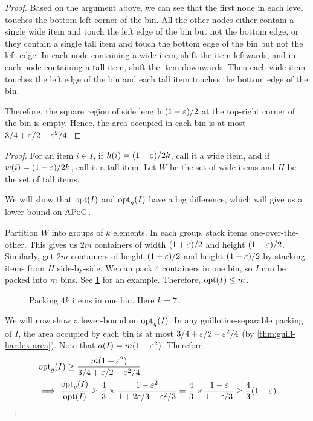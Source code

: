 \begin{proof}
Based on the argument above, we can see that the first node in each level
touches the bottom-left corner of the bin. All the other nodes either
contain a single wide item and touch the left edge of the bin but not the bottom edge,
or they contain a single tall item and touch the bottom edge of the bin but not the left edge.
In each node containing a wide item, shift the item leftwards,
and in each node containing a tall item, shift the item downwards.
Then each wide item touches the left edge of the bin
and each tall item touches the bottom edge of the bin.

Therefore, the square region of side length $(1-\varepsilon)/2$
at the top-right corner of the bin is empty.
Hence, the area occupied in each bin is at most $3/4 + \varepsilon/2 - \varepsilon^2/4$.
\end{proof}

\rdefHardItems*

\rthmAPoGLB*
\begin{proof}
For an item $i \in I$, if $h(i) = (1-\varepsilon)/2k$, call it a wide item,
and if $w(i) = (1-\varepsilon)/2k$, call it a tall item.
Let $W$ be the set of wide items and $H$ be the set of tall items.

We will show that $\operatorname{opt}(I)$ and $\operatorname{opt}_g(I)$ have a big difference,
which will give us a lower-bound on $\mathrm{APoG}$.

Partition $W$ into groups of $k$ elements.
In each group, stack items one-over-the-other.
This gives us $2m$ containers of width $(1+\varepsilon)/2$ and height $(1-\varepsilon)/2$.
Similarly, get $2m$ containers of height $(1+\varepsilon)/2$ and height $(1-\varepsilon)/2$
by stacking items from $H$ side-by-side.
We can pack 4 containers in one bin, so $I$ can be packed into $m$ bins.
See \cref{fig:thin-gadget} for an example.
Therefore, $\operatorname{opt}(I) \le m$.

\begin{figure}[htb]
\centering

\caption{Packing $4k$ items in one bin. Here $k = 7$.}
\label{fig:thin-gadget}
\end{figure}

We will now show a lower-bound on $\operatorname{opt}_g(I)$.
In any guillotine-separable packing of $I$,
the area occupied by each bin is at most $3/4 + \varepsilon/2 - \varepsilon^2/4$
(by \cref{thm:guill-hardex-area}).
Note that $a(I) = m(1 - \varepsilon^2)$. Therefore,
\begin{align*}
& \operatorname{opt}_g(I) \ge \frac{m(1-\varepsilon^2)}{3/4 + \varepsilon/2 - \varepsilon^2/4}
\\ &\implies \frac{\operatorname{opt}_g(I)}{\operatorname{opt}(I)}
    \ge \frac{4}{3} \times \frac{1-\varepsilon^2}{1 + 2\varepsilon/3 - \varepsilon^2/3}
    = \frac{4}{3} \times \frac{1-\varepsilon}{1 - \varepsilon/3}
    \ge \frac{4}{3}(1-\varepsilon)
\qedhere
\end{align*}
\end{proof}
